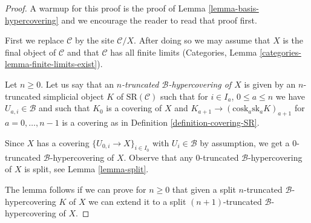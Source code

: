 \documentclass{stacks-project}
\theoremstyle{plain}
\theoremstyle{definition}
\theoremstyle{remark}
\numberwithin{equation}{subsection}
\begin{document}
\begin{proof}
A warmup for this proof is the proof of
Lemma \ref{lemma-basis-hypercovering} and
we encourage the reader to read that proof first.

\medskip\noindent
First we replace $\mathcal{C}$ by the site $\mathcal{C}/X$.
After doing so we may assume that $X$ is the final object
of $\mathcal{C}$ and that $\mathcal{C}$ has all finite limits
(Categories, Lemma \ref{categories-lemma-finite-limits-exist}).

\medskip\noindent
Let $n \geq 0$. Let us say that an
{\it $n$-truncated $\mathcal{B}$-hypercovering of $X$}
is given by an $n$-truncated simplicial object $K$
of $\text{SR}(\mathcal{C})$
such that for $i \in I_a$, $0 \leq a \leq n$
we have $U_{a, i} \in \mathcal{B}$ and such that
$K_0$ is a covering of $X$ and
$K_{a + 1} \to (\text{cosk}_a \text{sk}_a K)_{a + 1}$
for $a = 0, \ldots, n - 1$
is a covering as in Definition \ref{definition-covering-SR}.

\medskip\noindent
Since $X$ has a covering $\{U_{0, i} \to X\}_{i \in I_0}$
with $U_i \in \mathcal{B}$ by assumption, we get a $0$-truncated
$\mathcal{B}$-hypercovering of $X$. Observe that any $0$-truncated
$\mathcal{B}$-hypercovering of $X$ is split, see
Lemma \ref{lemma-split}.

\medskip\noindent
The lemma follows if we can prove for $n \geq 0$ that given a
split $n$-truncated $\mathcal{B}$-hypercovering $K$ of $X$
we can extend it to a
split $(n + 1)$-truncated $\mathcal{B}$-hypercovering of $X$.


\end{proof}
\end{document}
